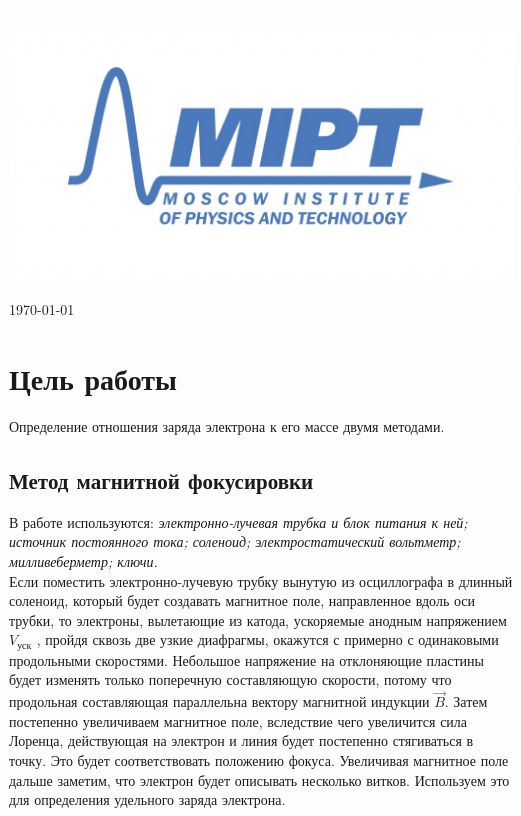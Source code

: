 \documentclass[a4paper, 12pt]{article}
\newenvironment{bottompar}{\par\vspace*{\fill}}{\clearpage}
\begin{document}
\begin{titlepage}
\begin{bottompar}
	\begin{center}
		\includegraphics[width = 80 mm]{logo.jpg}
	\end{center}
	{\large \today}

\end{bottompar}
\vfill %

\end{titlepage}

\section{Цель работы}

Определение отношения заряда электрона к его массе двумя методами.

\subsection*{Метод магнитной фокусировки}

В работе используются: \textit{электронно-лучевая трубка и блок питания к ней; источник постоянного тока; соленоид; электростатический вольтметр; милливеберметр; ключи.}\\[0.5cm]
Если поместить электронно-лучевую трубку вынутую из осциллографа в длинный соленоид, который будет создавать магнитное поле, направленное вдоль оси трубки, то электроны, вылетающие из катода, ускоряемые анодным напряжением $V_{\text{уск}}$ , пройдя сквозь две узкие диафрагмы, окажутся с примерно с одинаковыми продольными скоростями. Небольшое напряжение на отклоняющие пластины будет изменять только поперечную составляющую скорости, потому что продольная составляющая параллельна вектору магнитной индукции $\overrightarrow{B}$. Затем постепенно увеличиваем магнитное поле, вследствие чего увеличится сила Лоренца, действующая на электрон и линия будет постепенно стягиваться в точку. Это будет соответствовать положению фокуса. Увеличивая магнитное поле дальше заметим, что электрон будет описывать несколько витков. Используем это для определения удельного заряда электрона.
\end{document}
